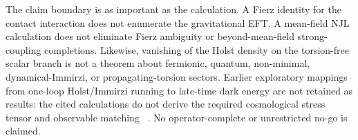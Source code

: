 \documentclass[aps,prd,twocolumn,superscriptaddress,preprintnumbers,nofootinbib,longbibliography,floatfix]{revtex4-2}
\newcommand{\fnl}{f_{\rm NL}}
\begin{document}
The claim boundary is as important as the calculation.  A Fierz identity for
the contact interaction does not enumerate the gravitational EFT.  A
mean-field NJL calculation does not eliminate Fierz ambiguity or
beyond-mean-field strong-coupling completions.  Likewise, vanishing of the
Holst density on the torsion-free scalar branch is not a theorem about
fermionic, quantum, non-minimal, dynamical-Immirzi, or propagating-torsion
sectors.  Earlier exploratory mappings from one-loop Holst/Immirzi running to
late-time dark energy are not retained as results: the cited calculations do
not derive the required cosmological stress tensor and observable matching
~\cite{ShapiroTeixeira2014,BenedettiSpeziale2011run}.  No operator-complete or
unrestricted no-go is claimed.

\end{document}
